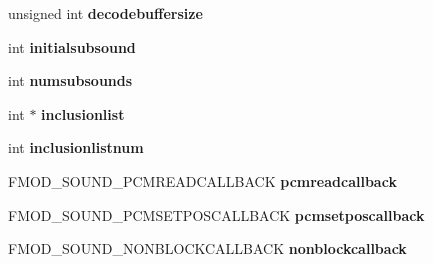 \begin{DoxyCompactItemize}
\item 
unsigned int {\bfseries decodebuffersize}\hypertarget{struct_f_m_o_d___c_r_e_a_t_e_s_o_u_n_d_e_x_i_n_f_o_a854f54e774c81c959da15a09348af9bf}{}\label{struct_f_m_o_d___c_r_e_a_t_e_s_o_u_n_d_e_x_i_n_f_o_a854f54e774c81c959da15a09348af9bf}

\item 
int {\bfseries initialsubsound}\hypertarget{struct_f_m_o_d___c_r_e_a_t_e_s_o_u_n_d_e_x_i_n_f_o_a0b6b37604abb632c74c1912b7de6cf8a}{}\label{struct_f_m_o_d___c_r_e_a_t_e_s_o_u_n_d_e_x_i_n_f_o_a0b6b37604abb632c74c1912b7de6cf8a}

\item 
int {\bfseries numsubsounds}\hypertarget{struct_f_m_o_d___c_r_e_a_t_e_s_o_u_n_d_e_x_i_n_f_o_a84eebd6ba29eb025470d074fb9c36c32}{}\label{struct_f_m_o_d___c_r_e_a_t_e_s_o_u_n_d_e_x_i_n_f_o_a84eebd6ba29eb025470d074fb9c36c32}

\item 
int $\ast$ {\bfseries inclusionlist}\hypertarget{struct_f_m_o_d___c_r_e_a_t_e_s_o_u_n_d_e_x_i_n_f_o_a6a9fda68184f91419dd8d523db749ad7}{}\label{struct_f_m_o_d___c_r_e_a_t_e_s_o_u_n_d_e_x_i_n_f_o_a6a9fda68184f91419dd8d523db749ad7}

\item 
int {\bfseries inclusionlistnum}\hypertarget{struct_f_m_o_d___c_r_e_a_t_e_s_o_u_n_d_e_x_i_n_f_o_ab06a599a0214646ffe412edc75ef812e}{}\label{struct_f_m_o_d___c_r_e_a_t_e_s_o_u_n_d_e_x_i_n_f_o_ab06a599a0214646ffe412edc75ef812e}

\item 
F\+M\+O\+D\+\_\+\+S\+O\+U\+N\+D\+\_\+\+P\+C\+M\+R\+E\+A\+D\+C\+A\+L\+L\+B\+A\+CK {\bfseries pcmreadcallback}\hypertarget{struct_f_m_o_d___c_r_e_a_t_e_s_o_u_n_d_e_x_i_n_f_o_aa58ca119eb7ae9de48bd4a187d9e9e45}{}\label{struct_f_m_o_d___c_r_e_a_t_e_s_o_u_n_d_e_x_i_n_f_o_aa58ca119eb7ae9de48bd4a187d9e9e45}

\item 
F\+M\+O\+D\+\_\+\+S\+O\+U\+N\+D\+\_\+\+P\+C\+M\+S\+E\+T\+P\+O\+S\+C\+A\+L\+L\+B\+A\+CK {\bfseries pcmsetposcallback}\hypertarget{struct_f_m_o_d___c_r_e_a_t_e_s_o_u_n_d_e_x_i_n_f_o_ac8e4d22cd238655b7b9a4d5c4623601c}{}\label{struct_f_m_o_d___c_r_e_a_t_e_s_o_u_n_d_e_x_i_n_f_o_ac8e4d22cd238655b7b9a4d5c4623601c}

\item 
F\+M\+O\+D\+\_\+\+S\+O\+U\+N\+D\+\_\+\+N\+O\+N\+B\+L\+O\+C\+K\+C\+A\+L\+L\+B\+A\+CK {\bfseries nonblockcallback}\hypertarget{struct_f_m_o_d___c_r_e_a_t_e_s_o_u_n_d_e_x_i_n_f_o_ac7d4f60695e9ae96c478692bb404e586}{}\label{struct_f_m_o_d___c_r_e_a_t_e_s_o_u_n_d_e_x_i_n_f_o_ac7d4f60695e9ae96c478692bb404e586}


\end{DoxyCompactItemize}
